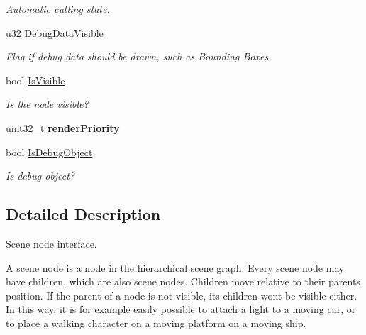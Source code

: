\begin{DoxyCompactItemize}
\begin{DoxyCompactList}\small\item\em Automatic culling state. \end{DoxyCompactList}\item 
\hyperlink{namespaceirr_a0416a53257075833e7002efd0a18e804}{u32} \hyperlink{classirr_1_1scene_1_1ISceneNode_a223a66d82d1c56e5f3730aeb9f83589c}{Debug\+Data\+Visible}\hypertarget{classirr_1_1scene_1_1ISceneNode_a223a66d82d1c56e5f3730aeb9f83589c}{}\label{classirr_1_1scene_1_1ISceneNode_a223a66d82d1c56e5f3730aeb9f83589c}

\begin{DoxyCompactList}\small\item\em Flag if debug data should be drawn, such as Bounding Boxes. \end{DoxyCompactList}\item 
bool \hyperlink{classirr_1_1scene_1_1ISceneNode_aa834128c57215457914ef46d9b18cc5e}{Is\+Visible}\hypertarget{classirr_1_1scene_1_1ISceneNode_aa834128c57215457914ef46d9b18cc5e}{}\label{classirr_1_1scene_1_1ISceneNode_aa834128c57215457914ef46d9b18cc5e}

\begin{DoxyCompactList}\small\item\em Is the node visible? \end{DoxyCompactList}\item 
uint32\+\_\+t {\bfseries render\+Priority}\hypertarget{classirr_1_1scene_1_1ISceneNode_ac04f784982056b494884f50782a70342}{}\label{classirr_1_1scene_1_1ISceneNode_ac04f784982056b494884f50782a70342}

\item 
bool \hyperlink{classirr_1_1scene_1_1ISceneNode_a8f1ba7c5e77eecc2adc6d12df0d27dd6}{Is\+Debug\+Object}\hypertarget{classirr_1_1scene_1_1ISceneNode_a8f1ba7c5e77eecc2adc6d12df0d27dd6}{}\label{classirr_1_1scene_1_1ISceneNode_a8f1ba7c5e77eecc2adc6d12df0d27dd6}

\begin{DoxyCompactList}\small\item\em Is debug object? \end{DoxyCompactList}\end{DoxyCompactItemize}


\subsection{Detailed Description}
Scene node interface. 

A scene node is a node in the hierarchical scene graph. Every scene node may have children, which are also scene nodes. Children move relative to their parent\textquotesingle{}s position. If the parent of a node is not visible, its children won\textquotesingle{}t be visible either. In this way, it is for example easily possible to attach a light to a moving car, or to place a walking character on a moving platform on a moving ship. 

